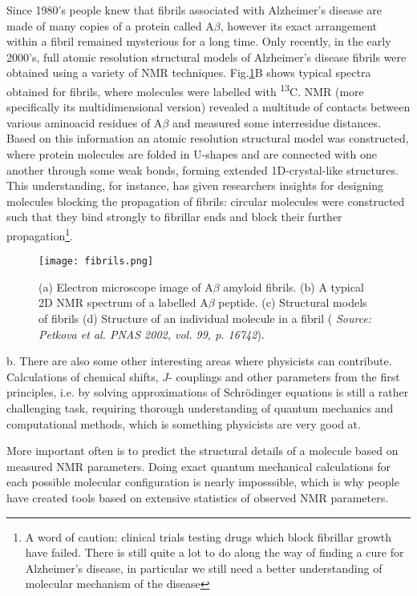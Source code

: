 \documentclass[a4paper, 12pt]{article}
\begin{document}
Since 1980's people knew that fibrils associated with Alzheimer's disease are made of many copies of a protein called A$\beta$, however its exact arrangement within a fibril remained mysterious for a long time. Only recently, in the early 2000's, full atomic resolution structural models of Alzheimer's disease fibrils were obtained using a variety of NMR techniques. Fig.\ref{fig:fibrils}B shows typical spectra obtained for fibrils, where molecules were labelled with \textsuperscript{13}C. NMR (more specifically its multidimensional version) revealed a multitude of contacts between various aminoacid residues of A$\beta$ and measured some interresidue distances. Based on this information an atomic resolution structural model was constructed, where protein molecules are folded in U-shapes and are connected with one another through some weak bonds, forming extended 1D-crystal-like structures. This understanding, for instance, has given researchers insights for designing molecules blocking the propagation of fibrils: circular molecules were constructed such that they bind strongly to fibrillar ends and block their further propagation\footnote{A word of caution: clinical trials testing drugs which block fibrillar growth have failed. There is still quite a lot to do along the way of finding a cure for Alzheimer's disease, in particular we still need a better understanding of molecular mechanism of the disease}.

\begin{figure}[ht]
\caption{(a) Electron microscope image of A$\beta$ amyloid fibrils. (b) A typical 2D NMR spectrum of a labelled A$\beta$ peptide. (c) Structural models of fibrils (d) Structure of an individual molecule in a fibril ( \textit{Source: Petkova et al. PNAS 2002, vol. 99, p. 16742}).}
\label{fig:fibrils}
\centering
\texttt{[image: fibrils.png]}
\end{figure}


b. There are also some other interesting areas where physicists can contribute. Calculations of chemical shifts, $J$- couplings and other parameters from the first principles, i.e. by solving approximations of Schr{\"o}dinger equations is still a rather challenging task, requiring thorough understanding of quantum mechanics and computational methods, which is something physicists are very good at.

  More important often is to predict the structural details of a molecule based on measured NMR parameters. Doing exact quantum mechanical calculations for each possible molecular configuration is nearly imposssible, which is why people have created tools based on extensive statistics of observed NMR parameters. 
 
\end{document}
